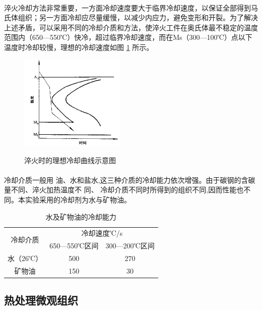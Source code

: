 \documentclass[12pt]{ctexart}
\begin{document}
\paragraph{}
 淬火冷却方法非常重要，一方面冷却速度要大于临界冷却速度，以保证全部得到马氏体组织；另一方面冷却应尽量缓慢，以减少内应力，避免变形和开裂。为了解决上述矛盾，可以采用不同的冷却介质和方法，使淬火工件在奥氏体最不稳定的温度范围内（650—550℃）快冷，超过临界冷却速度，而在Ms（300—100℃）点以下温度时冷却较慢，理想的冷却速度如图 \ref{cuihuoquxian} 所示。
\begin{figure}[h]
  \centering
  \includegraphics[width=5cm]{cuihuoquxian.jpg}\\
  \caption{淬火时的理想冷却曲线示意图}
  \label{cuihuoquxian}
\end{figure}



\paragraph{}
 冷却介质一般用 油、水和盐水,这三种介质的冷却能力依次增强。由于碳钢的含碳量不同、淬火加热温度不 同、 冷却介质不同时所得到的组织不同,因而性能也不同。本实验采用的冷却剂为水与矿物油。
\begin{table}[ht!]
  \centering
  \begin{tabular}{|c|c|c|}
     \hline
     \multirow{2}{*}{冷却介质}& \multicolumn{2}{c|}{冷却速度℃/s} \\
     \cline{2-3}
     &650—550℃区间& 300—200℃区间 \\
     \hline
     水（26℃）& 500 & 270 \\
     \hline
     矿物油 & 150 & 30 \\
     \hline
   \end{tabular}
  \caption{水及矿物油的冷却能力}
\end{table}
\subsection{热处理微观组织}
\end{document}
